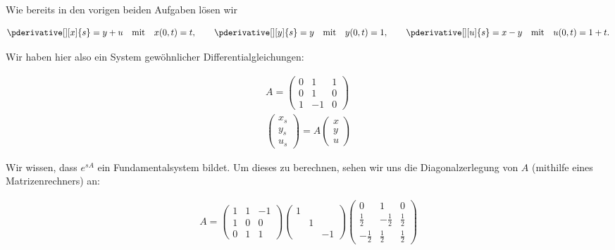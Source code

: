 \begin{solution}
Wie bereits in den vorigen beiden Aufgaben lösen wir

\begin{align*}
    \pderivative[][x]{s} = y + u \quad \text{mit} \quad x(0,t) = t, \qquad
    \pderivative[][y]{s} = y \quad \text{mit} \quad y(0,t) = 1, \qquad
    \pderivative[][u]{s} = x - y \quad \text{mit} \quad u(0,t) = 1 + t .
\end{align*}

Wir haben hier also ein System gewöhnlicher Differentialgleichungen:

\begin{align*}
  A =\left(
  \begin{array}{ccc}
  0 & 1 & 1 \\
  0 & 1 & 0 \\
  1 & -1 & 0
  \end{array}
  \right) \\
  \left(
  \begin{array}{c}
    x_s \\
    y_s \\
    u_s
  \end{array}
  \right) =
  A
  \left(
  \begin{array}{c}
    x \\
    y \\
    u
  \end{array}
  \right)
\end{align*}

Wir wissen, dass $e^{sA}$ ein Fundamentalsystem bildet. Um dieses zu berechnen,
sehen wir uns die Diagonalzerlegung von $A$ (mithilfe eines Matrizenrechners) an:

\begin{align*}
  A =
  \left(
  \begin{array}{ccc}
    1 & 1 & -1 \\
    1 & 0 & 0 \\
    0 & 1 & 1
  \end{array}
  \right)
  \left(
  \begin{array}{ccc}
    1 & & \\
    & 1 & \\
    & & -1
  \end{array}
  \right)
  \left(
  \begin{array}{ccc}
  0 & 1 & 0 \\
  \frac{1}{2} & - \frac{1}{2} & \frac{1}{2} \\
  - \frac{1}{2} & \frac{1}{2} & \frac{1}{2}
  \end{array}
  \right)
\end{align*}


\end{solution}
